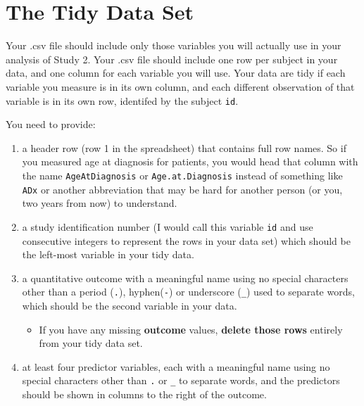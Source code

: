 \documentclass[]{book}
\providecommand{\tightlist}{%
  \setlength{\itemsep}{0pt}\setlength{\parskip}{0pt}}
\theoremstyle{definition}
\theoremstyle{definition}
\theoremstyle{definition}
\theoremstyle{remark}
\begin{document}
\hypertarget{the-tidy-data-set}{%
\section{The Tidy Data Set}\label{the-tidy-data-set}}

Your .csv file should include only those variables you will actually use
in your analysis of Study 2. Your .csv file should include one row per
subject in your data, and one column for each variable you will use.
Your data are tidy if each variable you measure is in its own column,
and each different observation of that variable is in its own row,
identifed by the subject \texttt{id}.

You need to provide:

\begin{enumerate}
\def\labelenumi{\arabic{enumi}.}
\tightlist
\item
  a header row (row 1 in the spreadsheet) that contains full row names.
  So if you measured age at diagnosis for patients, you would head that
  column with the name \texttt{AgeAtDiagnosis} or
  \texttt{Age.at.Diagnosis} instead of something like \texttt{ADx} or
  another abbreviation that may be hard for another person (or you, two
  years from now) to understand.
\item
  a study identification number (I would call this variable \texttt{id}
  and use consecutive integers to represent the rows in your data set)
  which should be the left-most variable in your tidy data.
\item
  a quantitative outcome with a meaningful name using no special
  characters other than a period (\texttt{.}), hyphen(\texttt{-}) or
  underscore (\texttt{\_}) used to separate words, which should be the
  second variable in your data.

  \begin{itemize}
  \tightlist
  \item
    If you have any missing \textbf{outcome} values, \textbf{delete
    those rows} entirely from your tidy data set.
  \end{itemize}
\item
  at least four predictor variables, each with a meaningful name using
  no special characters other than \texttt{.} or \texttt{\_} to separate
  words, and the predictors should be shown in columns to the right of
  the outcome.


\end{enumerate}
\end{document}
